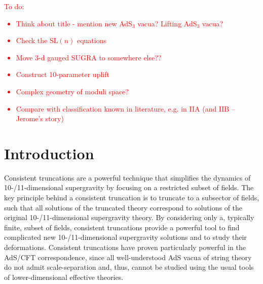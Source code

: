\documentclass[a4paper, 11pt]{article}
\numberwithin{equation}{section}
\newcommand{\SL}[1]{\mathrm{SL}( #1 )}
\newcommand{\+}{\oplus}
\newcommand{\EM}[1]{\textcolor{red}{#1}}
\begin{document}
\tableofcontents
	
\newpage

\EM{To do:
\begin{itemize}
	\item Think about title - mention new AdS$_3$ vacua? Lifting AdS$_3$ vacua?
	\item Check the $\SL{n}$ equations
	\item Move 3-d gauged SUGRA to somewhere else??
	\item Construct 10-parameter uplift
	\item Complex geometry of moduli space?
	\item Compare with classification known in literature, e.g. in IIA (and IIB -- Jerome's story)
\end{itemize}
}

\section{Introduction}
Consistent truncations are a powerful technique that simplifies the dynamics of 10-/11-dimensional supergravity by focusing on a restricted subset of fields. The key principle behind a consistent truncation is to truncate to a subsector of fields, such that all solutions of the truncated theory correspond to solutions of the original 10-/11-dimensional supergravity theory. By considering only a, typically finite, subset of fields, consistent truncations provide a powerful tool to find complicated new 10-/11-dimensional supergravity solutions and to study their deformations. Consistent truncations have proven particularly powerful in the AdS/CFT correspondence, since all well-understood AdS vacua of string theory do not admit scale-separation and, thus, cannot be studied using the usual tools of lower-dimensional effective theories.
\end{document}
